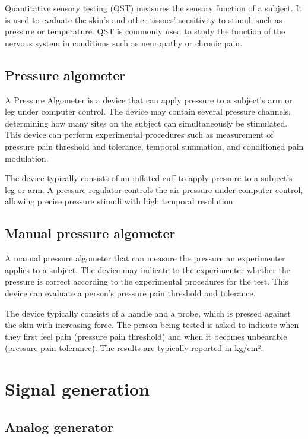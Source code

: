 Quantitative sensory testing (QST) measures the sensory function of a subject. It is used to evaluate the skin's and other tissues' sensitivity to stimuli such as pressure or temperature. QST is commonly used to study the function of the nervous system in conditions such as neuropathy or chronic pain. 

\subsection{Pressure algometer}
\label{subsec:PressureAlgometer}

A Pressure Algometer is a device that can apply pressure to a subject's arm or leg under computer control. The device may contain several pressure channels, determining how many sites on the subject can simultaneously be stimulated. This device can perform experimental procedures such as measurement of pressure pain threshold and tolerance, temporal summation, and conditioned pain modulation. 

The device typically consists of an inflated cuff to apply pressure to a subject's leg or arm. A pressure regulator controls the air pressure under computer control, allowing precise pressure stimuli with high temporal resolution.

\subsection{Manual pressure algometer}

A manual pressure algometer that can measure the pressure an experimenter applies to a subject. The device may indicate to the experimenter whether the pressure is correct according to the experimental procedures for the test. This device can evaluate a person's pressure pain threshold and tolerance.

The device typically consists of a handle and a probe, which is pressed against the skin with increasing force. The person being tested is asked to indicate when they first feel pain (pressure pain threshold) and when it becomes unbearable (pressure pain tolerance). The results are typically reported in kg/cm².

\section{Signal generation}

\subsection{Analog generator}

